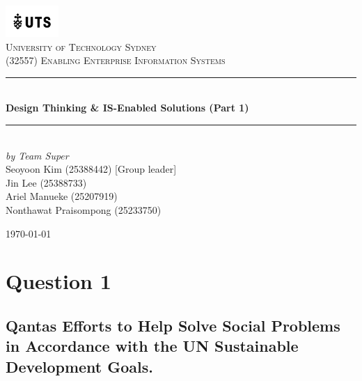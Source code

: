 \documentclass[12pt,a4paper]{article}
\begin{document}

\begin{titlepage}

\newcommand{\HRule}{\rule{\linewidth}{0.5mm}}
\center

\vspace*{1\baselineskip}
\includegraphics[width=0.15\textwidth]{images/UTS.png}\\
\textsc{\LARGE University of Technology Sydney}\\[2.0cm]
\textsc{\Large (32557) Enabling Enterprise Information Systems}\\[0.4cm]

\HRule\\[0.6cm]
{\huge\bfseries Design Thinking \& IS-Enabled Solutions (Part 1) }\\[0.4cm]
\HRule\\[10cm]

\emph{by Team Super} \\
{ Seoyoon Kim (25388442) [Group leader] \\}
{ Jin Lee (25388733)  \\}
{ Ariel Manueke (25207919) \\}
{ Nonthawat Praisompong (25233750) \\}

\vfill
{\large\today}

\vfill

\end{titlepage}


\tableofcontents
\thispagestyle{nofooter}
\cleardoublepage

\pagebreak




\setcounter{page}{1}

\section{Question 1}
\subsection{Qantas Efforts to Help Solve Social Problems in Accordance with the UN Sustainable Development Goals.}
\end{document}

